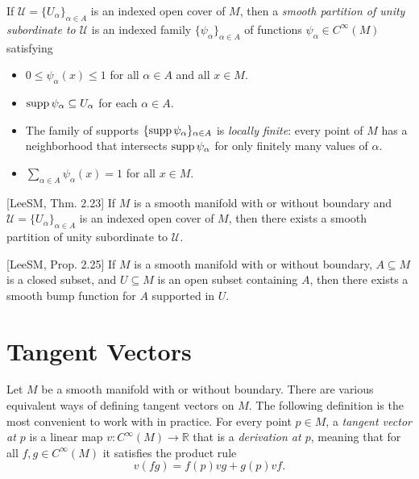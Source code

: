 If $\mathcal{U} = \{U_\alpha\}_{\alpha \in A}$ is an indexed open cover of $M$, then a \textit{smooth partition of
unity subordinate to $\mathcal{U}$} is an indexed family $\{\psi_\alpha\}_{\alpha \in A}$ of functions $\psi_\alpha \in C^{\infty}(M)$
satisfying
\begin{itemize}
  \item $0 \le \psi_\alpha(x) \le 1$ for all $\alpha \in A$ and all $x \in M$.
  \item $\operatorname{supp} \psi_\alpha \subseteq U_\alpha$ for each $\alpha \in A$.
  \item The family of supports $\{\operatorname{supp} \psi_\alpha\}_{\alpha \in A}$ is \textit{locally finite}: every point of $M$ has a
    neighborhood that intersects $\operatorname{supp} \psi_\alpha$ for only finitely many values of $\alpha$.
  \item $\sum_{\alpha \in A} \psi_\alpha(x) = 1$ for all $x \in M$.
\end{itemize}

\begin{proposition}
\label{prop:existence-partitions-unity}
[LeeSM, Thm. 2.23] If $M$ is a smooth manifold with or without boundary and $\mathcal{U} = \{U_\alpha\}_{\alpha \in A}$ is an indexed open cover of $M$, then there exists a smooth partition of unity subordinate to $\mathcal{U}$.
\end{proposition}

\begin{proposition}
\label{prop:existence-smooth-bump-functions}
[LeeSM, Prop. 2.25] If $M$ is a smooth manifold with or without boundary, $A \subseteq M$ is a closed subset, and $U \subseteq M$ is an open subset containing $A$, then there exists a smooth bump function for $A$ supported in $U$.
\end{proposition}

\section{Tangent Vectors}

Let $M$ be a smooth manifold with or without boundary. There are various equivalent ways of defining tangent vectors on $M$. The following definition is the most
convenient to work with in practice. For every point $p \in M$, a \textit{tangent vector at $p$}
is a linear map $v : C^{\infty}(M) \to \mathbb{R}$ that is a \textit{derivation at $p$}, meaning that for all
$f, g \in C^{\infty}(M)$ it satisfies the product rule
\begin{equation}
v(fg) = f(p)vg + g(p)vf.
\tag{A.1}
\end{equation}

